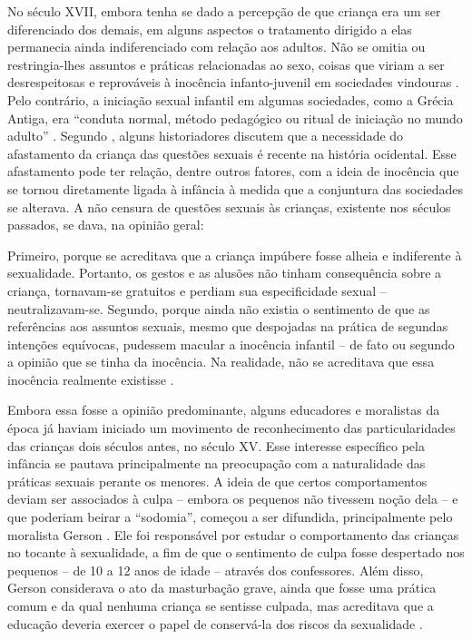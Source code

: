 No século XVII, embora tenha se dado a percepção de que criança era um ser diferenciado dos demais, em alguns aspectos o tratamento dirigido a elas permanecia ainda indiferenciado com relação aos adultos. Não se omitia ou restringia-lhes assuntos e práticas relacionadas ao sexo, coisas que viriam a ser desrespeitosas e reprováveis à inocência infanto-juvenil em sociedades vindouras \cite{MOTT1998}. Pelo contrário, a iniciação sexual infantil em algumas sociedades, como a Grécia Antiga, era ``conduta normal, método pedagógico ou ritual de iniciação no mundo adulto'' . Segundo , alguns historiadores discutem que a necessidade do afastamento da criança das questões sexuais é recente na história ocidental. Esse afastamento pode ter relação, dentre outros fatores, com a ideia de inocência que se tornou diretamente ligada à infância à medida que a conjuntura das sociedades se alterava. A não censura de questões sexuais às crianças, existente nos séculos passados, se dava, na opinião geral:

\begin{citacao}
	Primeiro, porque se acreditava que a criança impúbere fosse alheia e indiferente à sexualidade. Portanto, os gestos e as alusões não tinham consequência sobre a criança, tornavam-se gratuitos e perdiam sua especificidade sexual -- neutralizavam-se. Segundo, porque ainda não existia o sentimento de que as referências aos assuntos sexuais, mesmo que despojadas na prática de segundas intenções equívocas, pudessem macular a inocência infantil -- de fato ou segundo a opinião que se tinha da inocência. Na realidade, não se acreditava que essa inocência realmente existisse \cite[p. 132]{ARIES1981}.
\end{citacao}

Embora essa fosse a opinião predominante, alguns educadores e moralistas da época já haviam iniciado um movimento de reconhecimento das particularidades das crianças dois séculos antes, no século XV. Esse interesse específico pela infância se pautava principalmente na preocupação com a naturalidade das práticas sexuais perante os menores. A ideia de que certos comportamentos deviam ser associados à culpa -- embora os pequenos não tivessem noção dela -- e que poderiam beirar a ``sodomia'', começou a ser difundida, principalmente pelo moralista Gerson \cite[p. 80]{ARIES2011}. Ele foi responsável por estudar o comportamento das crianças no tocante à sexualidade, a fim de que o sentimento de culpa fosse despertado nos pequenos -- de 10 a 12 anos de idade -- através dos confessores. Além disso, Gerson considerava o ato da masturbação grave, ainda que fosse uma prática comum e da qual nenhuma criança se sentisse culpada, mas acreditava que a educação deveria exercer o papel de conservá-la dos riscos da sexualidade \cite{ARIES2011}.

